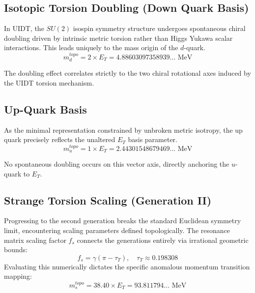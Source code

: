 \subsection{Isotopic Torsion Doubling (Down Quark Basis)}
\label{app_sec:down_quark}

In UIDT, the $SU(2)$ isospin symmetry structure undergoes spontaneous chiral doubling driven by intrinsic metric torsion rather than Higgs Yukawa scalar interactions. This leads uniquely to the mass origin of the $d$-quark.
\begin{equation}
m_d^{topo} = 2 \times E_T = 4.88603097358939 \dots \text{ MeV}
\end{equation}

\begin{tcolorbox}[colback=blue!5!white,colframe=blue!75!black,title={[Category B: Torsion Derivation]}]
The doubling effect correlates strictly to the two chiral rotational axes induced by the UIDT torsion mechanism.
\end{tcolorbox}

\subsection{Up-Quark Basis}
\label{app_sec:up_quark}

As the minimal representation constrained by unbroken metric isotropy, the up quark precisely reflects the unaltered $E_T$ basis parameter.
\begin{equation}
m_u^{topo} = 1 \times E_T = 2.44301548679469 \dots \text{ MeV}
\end{equation}

\begin{tcolorbox}[colback=blue!5!white,colframe=blue!75!black,title={[Category B: Baseline Mass Derivation]}]
No spontaneous doubling occurs on this vector axis, directly anchoring the $u$-quark to $E_T$.
\end{tcolorbox}

\subsection{Strange Torsion Scaling (Generation II)}
\label{app_sec:strange_quark}

Progressing to the second generation breaks the standard Euclidean symmetry limit, encountering scaling parameters defined topologically. The resonance matrix scaling factor $f_s$ connects the generations entirely via irrational geometric bounds:
\begin{equation}
f_s = \gamma(\pi - \tau_T), \quad \tau_T \approx 0.198308
\end{equation}
Evaluating this numerically dictates the specific anomalous momentum transition mapping:
\begin{equation}
m_s^{topo} = 38.40 \times E_T = 93.811794 \dots \text{ MeV}
\end{equation}

